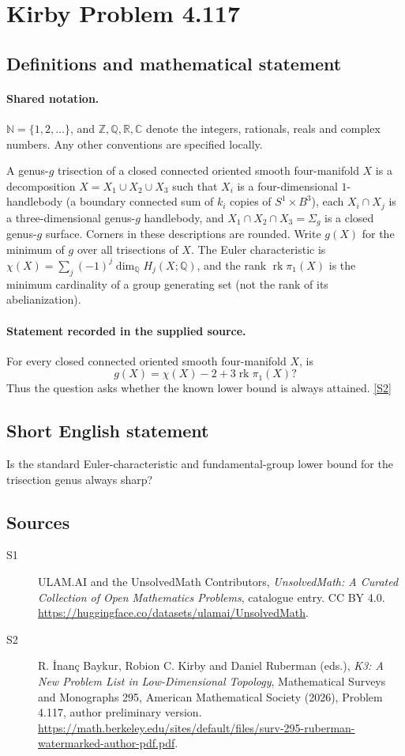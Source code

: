 \documentclass[11pt]{article}
\newcommand{\sref}[2]{\hyperlink{source:#1:#2}{[S#2]}}
\begin{document}
\section{Kirby Problem 4.117}\label{statement}

\subsection{Definitions and mathematical statement}

\paragraph{Shared notation.}$\mathbb N=\{1,2,\ldots\}$, and $\mathbb Z,\mathbb Q,\mathbb R,\mathbb C$ denote the integers, rationals, reals and complex numbers. Any other conventions are specified locally.


A genus-$g$ trisection of a closed connected oriented smooth four-manifold $X$ is a decomposition $X=X_1\cup X_2\cup X_3$ such that $X_i$ is a four-dimensional $1$-handlebody (a boundary connected sum of $k_i$ copies of $S^1\times B^3$), each $X_i\cap X_j$ is a three-dimensional genus-$g$ handlebody, and $X_1\cap X_2\cap X_3=\Sigma_g$ is a closed genus-$g$ surface. Corners in these descriptions are rounded. Write $g(X)$ for the minimum of $g$ over all trisections of $X$. The Euler characteristic is $\chi(X)=\sum_j(-1)^j\dim_{\mathbb Q}H_j(X;\mathbb Q)$, and the rank $\operatorname{rk}\pi_1(X)$ is the minimum cardinality of a group generating set (not the rank of its abelianization).
\paragraph{Statement recorded in the supplied source.}
For every closed connected oriented smooth four-manifold $X$, is
\[
 g(X)=\chi(X)-2+3\operatorname{rk}\pi_1(X)?
\]
Thus the question asks whether the known lower bound is always attained. \sref{statement}{2}
\subsection{Short English statement}
Is the standard Euler-characteristic and fundamental-group lower bound for the trisection genus always sharp?
\subsection{Sources}
\begin{description}
\item[\hypertarget{source:statement:1}{S1}] ULAM.AI and the UnsolvedMath Contributors, \emph{UnsolvedMath: A Curated Collection of Open Mathematics Problems}, catalogue entry. CC BY 4.0. \url{https://huggingface.co/datasets/ulamai/UnsolvedMath}.
\item[\hypertarget{source:statement:2}{S2}] R. İnanç Baykur, Robion C. Kirby and Daniel Ruberman (eds.), \emph{K3: A New Problem List in Low-Dimensional Topology}, Mathematical Surveys and Monographs 295, American Mathematical Society (2026), Problem 4.117, author preliminary version. \url{https://math.berkeley.edu/sites/default/files/surv-295-ruberman-watermarked-author-pdf.pdf}.
\end{description}
\label{end:statement}
\end{document}
